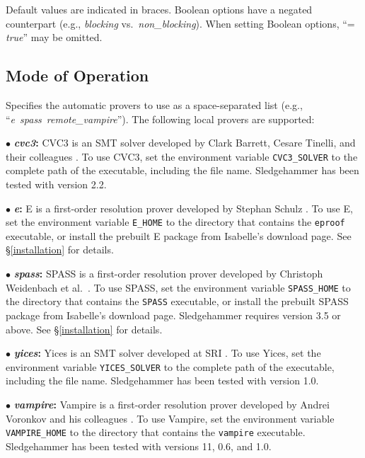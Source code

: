 \documentclass[a4paper,12pt]{article}
\begin{document}
Default values are indicated in braces. Boolean options have a negated
counterpart (e.g., \textit{blocking} vs.\ \textit{non\_blocking}). When setting
Boolean options, ``= \textit{true}'' may be omitted.

\subsection{Mode of Operation}
\label{mode-of-operation}

\begin{enum}
Specifies the automatic provers to use as a space-separated list (e.g.,
``\textit{e}~\textit{spass}~\textit{remote\_vampire}''). The following local
provers are supported:

\begin{enum}
\item[$\bullet$] \textbf{\textit{cvc3}:} CVC3 is an SMT solver developed by
Clark Barrett, Cesare Tinelli, and their colleagues \cite{cvc3}. To use CVC3,
set the environment variable \texttt{CVC3\_SOLVER} to the complete path of the
executable, including the file name. Sledgehammer has been tested with version
2.2.

\item[$\bullet$] \textbf{\textit{e}:} E is a first-order resolution prover
developed by Stephan Schulz \cite{schulz-2002}. To use E, set the environment
variable \texttt{E\_HOME} to the directory that contains the \texttt{eproof}
executable, or install the prebuilt E package from Isabelle's download page. See
\S\ref{installation} for details.

\item[$\bullet$] \textbf{\textit{spass}:} SPASS is a first-order resolution
prover developed by Christoph Weidenbach et al.\ \cite{weidenbach-et-al-2009}.
To use SPASS, set the environment variable \texttt{SPASS\_HOME} to the directory
that contains the \texttt{SPASS} executable, or install the prebuilt SPASS
package from Isabelle's download page. Sledgehammer requires version 3.5 or
above. See \S\ref{installation} for details.

\item[$\bullet$] \textbf{\textit{yices}:} Yices is an SMT solver developed at
SRI \cite{yices}. To use Yices, set the environment variable
\texttt{YICES\_SOLVER} to the complete path of the executable, including the
file name. Sledgehammer has been tested with version 1.0.

\item[$\bullet$] \textbf{\textit{vampire}:} Vampire is a first-order resolution
prover developed by Andrei Voronkov and his colleagues
\cite{riazanov-voronkov-2002}. To use Vampire, set the environment variable
\texttt{VAMPIRE\_HOME} to the directory that contains the \texttt{vampire}
executable. Sledgehammer has been tested with versions 11, 0.6, and 1.0.


\end{enum}
\end{enum}
\end{document}
